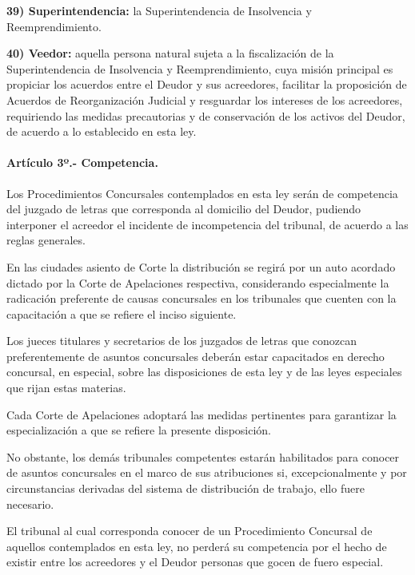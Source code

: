 \documentclass[
]{book}
\begin{document}
\textbf{39) Superintendencia:} la Superintendencia de Insolvencia y Reemprendimiento.

\textbf{40) Veedor:} aquella persona natural sujeta a la fiscalización de la Superintendencia de Insolvencia y Reemprendimiento, cuya misión principal es propiciar los acuerdos entre el Deudor y sus acreedores, facilitar la proposición de Acuerdos de Reorganización Judicial y resguardar los intereses de los acreedores, requiriendo las medidas precautorias y de conservación de los activos del Deudor, de acuerdo a lo establecido en esta ley.

\hypertarget{artuxedculo-3uxba.--competencia.}{%
\paragraph*{Artículo 3º.- Competencia.}\label{artuxedculo-3uxba.--competencia.}}

Los Procedimientos Concursales contemplados en esta ley serán de competencia del juzgado de letras que corresponda al domicilio del Deudor, pudiendo interponer el acreedor el incidente de incompetencia del tribunal, de acuerdo a las reglas generales.

En las ciudades asiento de Corte la distribución se regirá por un auto acordado dictado por la Corte de Apelaciones respectiva, considerando especialmente la radicación preferente de causas concursales en los tribunales que cuenten con la capacitación a que se refiere el inciso siguiente.

Los jueces titulares y secretarios de los juzgados de letras que conozcan preferentemente de asuntos concursales deberán estar capacitados en derecho concursal, en especial, sobre las disposiciones de esta ley y de las leyes especiales que rijan estas materias.

Cada Corte de Apelaciones adoptará las medidas pertinentes para garantizar la especialización a que se refiere la presente disposición.

No obstante, los demás tribunales competentes estarán habilitados para conocer de asuntos concursales en el marco de sus atribuciones si, excepcionalmente y por circunstancias derivadas del sistema de distribución de trabajo, ello fuere necesario.

El tribunal al cual corresponda conocer de un Procedimiento Concursal de aquellos contemplados en esta ley, no perderá su competencia por el hecho de existir entre los acreedores y el Deudor personas que gocen de fuero especial.
\end{document}

